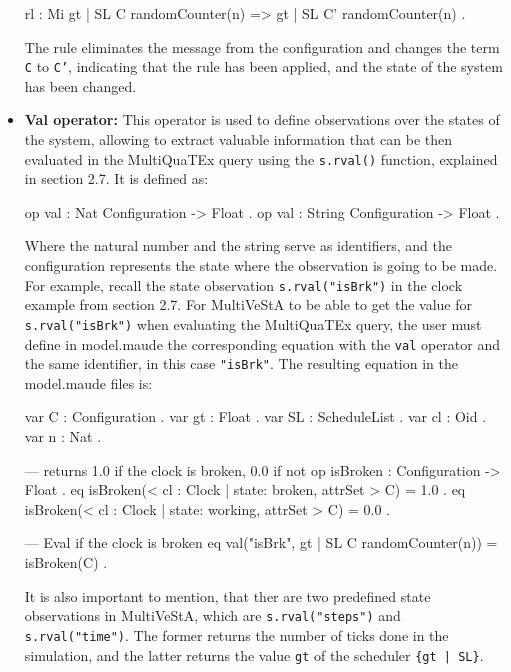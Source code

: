 \begin{itemize}
\begin{maude}
rl : Mi {gt | SL} {C randomCounter(n)} =>
        {gt | SL} {C' randomCounter(n)} .\end{maude}
The rule eliminates the message from the configuration and changes the term \texttt{C} to \texttt{C'}, indicating that the rule has been applied, and the state of the system has been changed.

\item \textbf{Val operator:} This operator is used to define observations over the states of the system, allowing to extract valuable information that can be then evaluated in the MultiQuaTEx query using the \texttt{s.rval()} function, explained in section 2.7. It is defined as:
\begin{maude}

op val : Nat Configuration -> Float .
op val : String Configuration -> Float . \end{maude}
Where the natural number and the string serve as identifiers, and the configuration represents the state where the observation is going to be made. For example, recall the state observation \texttt{s.rval("isBrk")} in the clock example from section 2.7. For MultiVeStA to be able to get the value for \texttt{s.rval("isBrk")} when evaluating the MultiQuaTEx query, the user must define in model.maude the corresponding equation with the \texttt{val} operator and the same identifier, in this case \texttt{"isBrk"}. The resulting equation in the model.maude files is:
\begin{maude}

var C : Configuration .
var gt : Float .
var SL : ScheduleList .
var cl : Oid .
var n : Nat .

--- returns 1.0 if the clock is broken, 0.0 if not
op isBroken : Configuration -> Float .
eq isBroken(< cl : Clock | state: broken, attrSet > C) = 1.0 .
eq isBroken(< cl : Clock | state: working, attrSet > C) = 0.0 .

--- Eval if the clock is broken
eq val("isBrk", {gt | SL} {C randomCounter(n)}) = isBroken(C) .\end{maude}

It is also important to mention, that ther are two predefined state observations in MultiVeStA, which are \texttt{s.rval("steps")} and \texttt{s.rval("time")}. The former returns the number of ticks done in the simulation, and the latter returns the value \texttt{gt} of the scheduler \texttt{\{gt | SL\}}.
\end{itemize}

